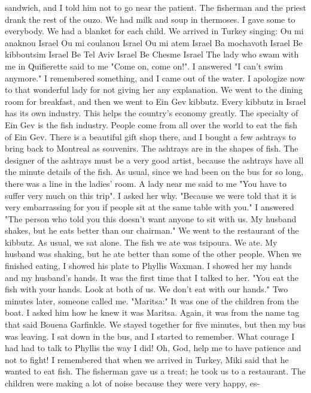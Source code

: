 sandwich, and I told him not to go near the patient. The fisherman and 
the priest drank the rest of the ouzo. We had milk and soup in thermoses. 
I gave some to everybody. We had a blanket for each child. We arrived 
in Turkey singing: 
Ou mi anaknou Israel 
Ou mi coulanou Israel 
Ou mi atem Israel 
Ba mochavoth Israel 
Be kibboutsim Israel 
Be Tel Aviv Israel 
Be Chesme Israel 
The lady who swam with me in Quifierette said to me "Come on, come on!". 
I answered "I can't swim anymore." I remembered something, and I came  out of the water. I apologize now to that wonderful lady for not giving her any explanation. 
We went to the dining room for breakfast, and then we went to Ein Gev 
kibbutz. Every kibbutz in Israel has its own industry. This helps the 
country's economy greatly. The specialty of Ein Gev is the fish industry. People come from all over the world to eat the fish of Ein Gev. 
There is a beautiful gift shop there, and I bought a few ashtrays to bring 
back to Montreal as souvenirs. The ashtrays are in the shapes of fish. 
The designer of the ashtrays must be a very good artist, because the ashtrays 
have all the minute details of the fish. 
As usual, since we had been on the bus for so long, there was a line in 
the ladies' room. A lady near me said to me "You have to suffer very much 
on this trip". I asked her why. "Because we were told that it is very embarrassing for you if people sit at the same table with you." I answered 
"The person who told you this doesn't want anyone to sit with us. My husband shakes, but he eats better than our chairman." 
We went to the restaurant of the kibbutz. As usual, we sat alone. The 
fish we ate was tsipoura. We ate. My husband was shaking, but he ate better than some of the other people. When we finished eating, I showed 
his plate to Phyllis Waxman. I showed her my hands and my husband's hands. It was the first time that I talked to her. "You eat the fish 
with your hands. Look at both of us. We don't eat with our hands." 
Two minutes later, someone called me. "Maritsa:" It was one of the children from the boat. I asked him how he knew it was Maritsa. Again, it was from the name tag that said Bouena Garfinkle. We stayed together for five minutes, but then my bus was leaving. I sat down in the bus, and I started to remember. What courage I had had to talk to Phyllis the way I did! Oh, God, help me to have patience and not to fight!
I remembered that when we arrived in Turkey, Miki said that he wanted 
to eat fish. The fisherman gave us a treat; he took us to a restaurant. 
The children were making a lot of noise because they were very happy, es-
